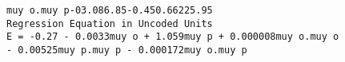 \documentclass[12pt,a4paper]{article}
\newcommand{\code}[1]{\texttt{#1}}
\begin{document}
\code{muy o.muy p}\hspace*{0.8cm}\code{-03.08}\hspace*{1.7cm}\code{6.85}\hspace*{1.45cm}\code{-0.45}\hspace*{1.4cm}\code{0.662}\hspace*{0.5cm}\code{25.95}\\
\newline
\code{Regression Equation in Uncoded Units}\\
\code{E = -0.27 - 0.0033muy o + 1.059muy p + 0.000008muy o.muy o \\ \hspace*{4cm}- 0.00525muy p.muy p - 0.000172muy o.muy p}\\
\end{document}
